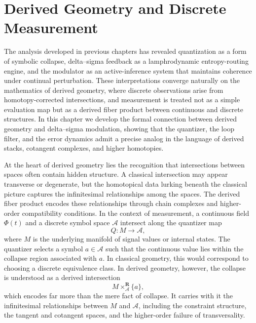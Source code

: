 
\chapter{Derived Geometry and Discrete Measurement}

The analysis developed in previous chapters has revealed quantization as a form of symbolic collapse, delta–sigma feedback as a lamphrodynamic entropy-routing engine, and the modulator as an active-inference system that maintains coherence under continual perturbation. These interpretations converge naturally on the mathematics of derived geometry, where discrete observations arise from homotopy-corrected intersections, and measurement is treated not as a simple evaluation map but as a derived fiber product between continuous and discrete structures. In this chapter we develop the formal connection between derived geometry and delta–sigma modulation, showing that the quantizer, the loop filter, and the error dynamics admit a precise analog in the language of derived stacks, cotangent complexes, and higher homotopies.

At the heart of derived geometry lies the recognition that intersections between spaces often contain hidden structure. A classical intersection may appear transverse or degenerate, but the homotopical data lurking beneath the classical picture captures the infinitesimal relationships among the spaces. The derived fiber product encodes these relationships through chain complexes and higher-order compatibility conditions. In the context of measurement, a continuous field \(\Phi(t)\) and a discrete symbol space \(\mathcal{A}\) intersect along the quantizer map
\[
Q : M \longrightarrow \mathcal{A},
\]
where \(M\) is the underlying manifold of signal values or internal states. The quantizer selects a symbol \(a \in \mathcal{A}\) such that the continuous value lies within the collapse region associated with \(a\). In classical geometry, this would correspond to choosing a discrete equivalence class. In derived geometry, however, the collapse is understood as a derived intersection
\[
M \times^{\mathbf{R}}_{\mathcal{A}} \{a\},
\]
which encodes far more than the mere fact of collapse. It carries with it the infinitesimal relationships between \(M\) and \(\mathcal{A}\), including the constraint structure, the tangent and cotangent spaces, and the higher-order failure of transversality.

